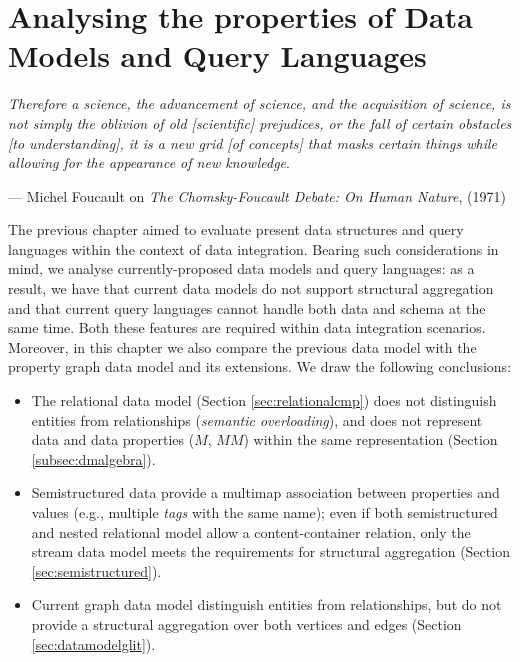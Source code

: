 \chapter{Analysing the properties of Data Models and Query Languages}\label{cha:datadef}

\epigraph{\textit{Therefore a science, the advancement of science, and the acquisition of science, is not simply the oblivion of old [scientific] prejudices, or the fall of certain obstacles [to understanding], it is a new grid [of concepts] that masks certain things while allowing for the appearance of new knowledge}.}{--- Michel Foucault on \textit{The Chomsky-Foucault Debate: On Human Nature}, (1971)}

The previous chapter aimed to evaluate present data structures and query languages within the context of data integration. Bearing such considerations in mind, we analyse currently-proposed data models and query languages: as a result, we have that current data models do not support structural aggregation and that current query languages cannot handle both data and schema at the same time. Both these features are required within data integration scenarios. Moreover, in this chapter we also compare the previous data model with the property graph data model and its extensions. We draw the following conclusions:
\begin{itemize}
\item The relational data model (Section \ref{sec:relationalcmp}) does not distinguish entities from relationships (\textit{semantic overloading}), and does not represent data and data properties ($M$, $MM$) within the same representation (Section \ref{subsec:dmalgebra}).
\item Semistructured data provide a multimap association between properties and values (e.g., multiple \textit{tags} with the same name); even if both semistructured and nested relational model allow a content-container relation, only the stream data model meets the requirements for  structural aggregation (Section \ref{sec:semistructured}).
\item Current graph data model distinguish entities from relationships, but do not provide a structural aggregation over both vertices and edges (Section \ref{sec:datamodelglit}).
\end{itemize}


